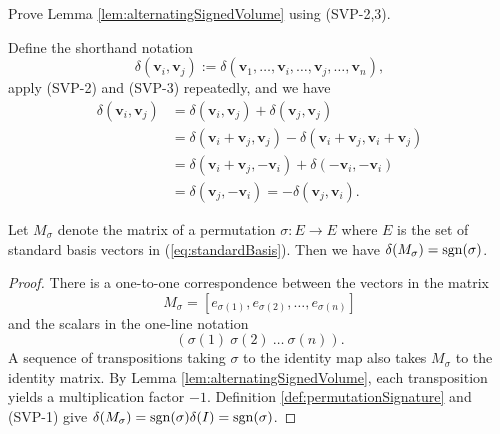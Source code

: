 \begin{exc}
  Prove Lemma \ref{lem:alternatingSignedVolume} using (SVP-2,3).
\end{exc}
\begin{solution}
  Define the shorthand notation
  \begin{displaymath}
    \delta(\mathbf{v}_i, \mathbf{v}_j)
    := \delta(\mathbf{v}_1, \ldots,
    \mathbf{v}_{i},\ldots, \mathbf{v}_{j},
    \ldots, \mathbf{v}_n), 
  \end{displaymath}
  apply (SVP-2) and (SVP-3) repeatedly, and we have 
  \begin{align*}
    \delta(\mathbf{v}_i, \mathbf{v}_j)
    &= \delta(\mathbf{v}_i, \mathbf{v}_j)
      + \delta(\mathbf{v}_j, \mathbf{v}_j)
    \\
    &= \delta(\mathbf{v}_i+\mathbf{v}_j, \mathbf{v}_j)
      - \delta(\mathbf{v}_i+\mathbf{v}_j, \mathbf{v}_i+\mathbf{v}_j)
    \\
    &= \delta(\mathbf{v}_i+\mathbf{v}_j, -\mathbf{v}_i)
      + \delta(-\mathbf{v}_i, -\mathbf{v}_i)
    \\
    &= \delta(\mathbf{v}_j, -\mathbf{v}_i)
      = -\delta(\mathbf{v}_j, \mathbf{v}_i).
  \end{align*}
\end{solution}

\begin{lem}
  \label{lem:matrixPermIsSgnSigma}
  Let $M_{\sigma}$ denote the matrix of a permutation
  $\sigma: E \rightarrow E$ where $E$ is the set of standard basis
  vectors in (\ref{eq:standardBasis}). 
  Then we have $\delta(M_{\sigma}) = \mathrm{sgn}(\sigma)$.
\end{lem}
\begin{proof}
  There is a one-to-one correspondence
  between the vectors in the matrix
  \begin{displaymath}
    M_{\sigma} = [e_{\sigma(1)}, e_{\sigma(2)}, \ldots, e_{\sigma(n)}]
  \end{displaymath}
  and the scalars in the one-line notation
  \begin{displaymath}
    (\sigma(1)\  \sigma(2)\ \ldots\ \sigma(n)).
  \end{displaymath}
  A sequence of transpositions taking $\sigma$
   to the identity map also
   takes $M_{\sigma}$ to the identity matrix.
  By Lemma \ref{lem:alternatingSignedVolume},
  each transposition yields a multiplication factor $-1$.
  Definition \ref{def:permutationSignature}
  and (SVP-1) give
  $\delta(M_{\sigma})=\mathrm{sgn}(\sigma)\delta(I)=\mathrm{sgn}(\sigma)$.
\end{proof}

